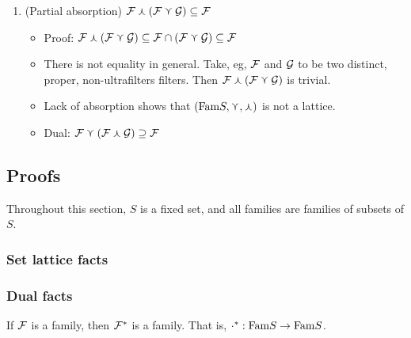 \begin{enumerate}
\begin{itemize}
        \item {}
    \end{itemize}

    \item (Partial absorption) $\mathcal{F} \curlywedge (\mathcal{F} \curlyvee \mathcal{G}) \subseteq \mathcal{F}$
    \begin{itemize}
        \item Proof: $\mathcal{F} \curlywedge (\mathcal{F} \curlyvee \mathcal{G}) \subseteq \mathcal{F} \cap (\mathcal{F} \curlyvee \mathcal{G}) \subseteq \mathcal{F}$

        \item There is not equality in general.  Take, eg, $\mathcal{F}$ and $\mathcal{G}$ to be two distinct, proper, non-ultrafilters filters.  Then $\mathcal{F} \curlywedge (\mathcal{F} \curlyvee \mathcal{G})$ is trivial.

        \item Lack of absorption shows that $(\text{Fam}{S}, \curlyvee, \curlywedge)$ is not a lattice.

        \item Dual: $\mathcal{F} \curlyvee (\mathcal{F} \curlywedge \mathcal{G}) \supseteq \mathcal{F}$
    \end{itemize}
\end{enumerate}

\subsection{Proofs}

Throughout this section, $S$ is a fixed set, and all families are families of subsets of $S$.

\subsubsection{Set lattice facts}


\subsubsection{Dual facts}

\begin{theorem}
    \label{thm_dual_of_fam_is_fam}
    If $\mathcal{F}$ is a family, then $\mathcal{F}^*$ is a family.  That is, $\cdot^*: \text{Fam}{S} \to \text{Fam}{S}$.
\end{theorem}

